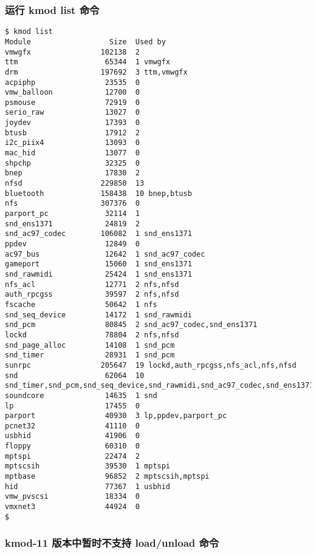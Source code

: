 \documentclass[11pt,a4paper]{article}
\begin{document}
\subsubsection{运行 kmod list 命令}

{\begin{shaded}\begin{verbatim}
$ kmod list
Module                  Size  Used by
vmwgfx                102138  2 
ttm                    65344  1 vmwgfx
drm                   197692  3 ttm,vmwgfx
acpiphp                23535  0 
vmw_balloon            12700  0 
psmouse                72919  0 
serio_raw              13027  0 
joydev                 17393  0 
btusb                  17912  2 
i2c_piix4              13093  0 
mac_hid                13077  0 
shpchp                 32325  0 
bnep                   17830  2 
nfsd                  229850  13 
bluetooth             158438  10 bnep,btusb
nfs                   307376  0 
parport_pc             32114  1 
snd_ens1371            24819  2 
snd_ac97_codec        106082  1 snd_ens1371
ppdev                  12849  0 
ac97_bus               12642  1 snd_ac97_codec
gameport               15060  1 snd_ens1371
snd_rawmidi            25424  1 snd_ens1371
nfs_acl                12771  2 nfs,nfsd
auth_rpcgss            39597  2 nfs,nfsd
fscache                50642  1 nfs
snd_seq_device         14172  1 snd_rawmidi
snd_pcm                80845  2 snd_ac97_codec,snd_ens1371
lockd                  78804  2 nfs,nfsd
snd_page_alloc         14108  1 snd_pcm
snd_timer              28931  1 snd_pcm
sunrpc                205647  19 lockd,auth_rpcgss,nfs_acl,nfs,nfsd
snd                    62064  10 snd_timer,snd_pcm,snd_seq_device,snd_rawmidi,snd_ac97_codec,snd_ens1371
soundcore              14635  1 snd
lp                     17455  0 
parport                40930  3 lp,ppdev,parport_pc
pcnet32                41110  0 
usbhid                 41906  0 
floppy                 60310  0 
mptspi                 22474  2 
mptscsih               39530  1 mptspi
mptbase                96852  2 mptscsih,mptspi
hid                    77367  1 usbhid
vmw_pvscsi             18334  0 
vmxnet3                44924  0 
$ 
\end{verbatim}\end{shaded}}
\subsubsection{kmod-11 版本中暂时不支持 load/unload 命令}
\end{document}
